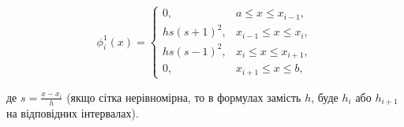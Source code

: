 \[ \phi_i^1(x) = \begin{cases} 0, & a \le x \le x_{i-1}, \\ hs(s+1)^2, & x_{i-1}\le x\le x_i, \\ hs(s-1)^2, & x_i\le x\le x_{i+1}, \\ 0, & x_{i+1} \le x \le b, \end{cases} \]

де $s = \frac{x-x_i}{h}$ (якщо сітка нерівномірна, то в формулах замість $h$, буде $h_i$ або $h_{i+1}$ на відповідних інтервалах). \\

